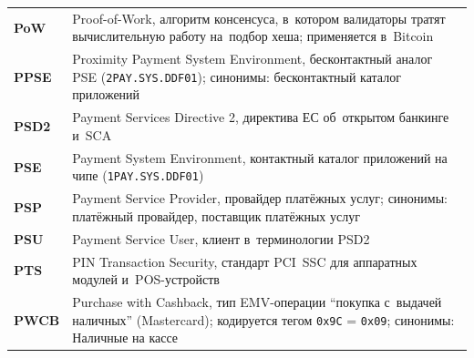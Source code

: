 \begin{longtable}{@{}p{4.5em}p{\dimexpr\linewidth-4.5em-2\tabcolsep\relax}@{}}
  \textbf{PoW}               & Proof-of-Work, алгоритм консенсуса, в~котором валидаторы тратят вычислительную работу на~подбор хеша; применяется в~Bitcoin                                                                                                                                                                      \\
  \textbf{PPSE}              & Proximity Payment System Environment, бесконтактный аналог PSE (\texttt{2PAY.SYS.DDF01}); синонимы: бесконтактный каталог приложений                                                                                                                                                              \\
  \textbf{PSD2}              & Payment Services Directive 2, директива ЕС об~открытом банкинге и~SCA                                                                                                                                                                                                                            \\
  \textbf{PSE}               & Payment System Environment, контактный каталог приложений на чипе (\texttt{1PAY.SYS.DDF01})                                                                                                                                                                                                      \\
  \textbf{PSP}               & Payment Service Provider, провайдер платёжных услуг; синонимы: платёжный провайдер, поставщик платёжных услуг                                                                                                                                                                                    \\
  \textbf{PSU}               & Payment Service User, клиент в~терминологии PSD2                                                                                                                                                                                                                                                 \\
  \textbf{PTS}               & PIN Transaction Security, стандарт PCI~SSC для аппаратных модулей и~POS-устройств                                                                                                                                                                                                                \\
  \textbf{PWCB}              & Purchase with Cashback, тип EMV-операции \enquote{покупка с~выдачей наличных} (Mastercard); кодируется тегом \texttt{0x9C} = \texttt{0x09}; синонимы: Наличные на кассе                                                                                                                            \\

\end{longtable}
